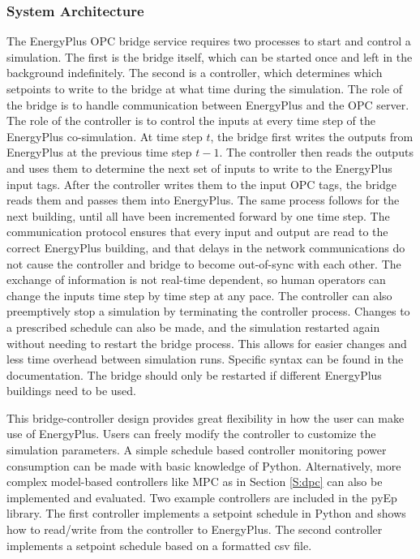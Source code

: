 \subsubsection{System Architecture}


The EnergyPlus OPC bridge service requires two processes to start and control a simulation. 
The first is the bridge itself, which can be started once and left in the background indefinitely. 
The second is a controller, which determines which setpoints to write to the bridge at what time during the simulation. 
The role of the bridge is to handle communication between EnergyPlus and the OPC server. 
The role of the controller is to control the inputs at every time step of the EnergyPlus co-simulation.
At time step $t$, the bridge first writes the outputs from EnergyPlus at the previous time step $t-1$. 
The controller then reads the outputs and uses them to determine the next set of inputs to write to the EnergyPlus input tags. 
After the controller writes them to the input OPC tags, the bridge reads them and passes them into EnergyPlus. 
The same process follows for the next building, until all have been incremented forward by one time step.
The communication protocol ensures that every input and output are read to the correct EnergyPlus building, and that delays in the network communications do not cause the controller and bridge to become out-of-sync with each other. 
The exchange of information is not real-time dependent, so human operators can change the inputs time step by time step at any pace. 
The controller can also preemptively stop a simulation by terminating the controller process. 
Changes to a prescribed schedule can also be made, and the simulation restarted again without needing to restart the bridge process. 
This allows for easier changes and less time overhead between simulation runs.
Specific syntax can be found in the documentation. 
The bridge should only be restarted if different EnergyPlus buildings need to be used.

This bridge-controller design provides great flexibility in how the user can make use of EnergyPlus. 
Users can freely modify the controller to customize the simulation parameters. 
A simple schedule based controller monitoring power consumption can be made with basic knowledge of Python. 
Alternatively, more complex model-based controllers like MPC as in Section \ref{S:dpc} can also be implemented and evaluated.
Two example controllers are included in the pyEp library. 
The first controller implements a setpoint schedule in Python and shows how to read/write from the controller to EnergyPlus. 
The second controller implements a setpoint schedule based on a formatted csv file. 

